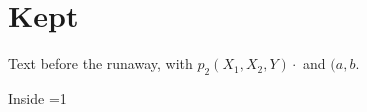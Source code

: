 \documentclass{article}
\begin{document}
\section{Kept}
Text before the runaway, with $p_{2}(X_{1},X_{2},Y)\cdot$ and $(a,b$.
\def\spin{=1 \expandafter\spin\fi}
\begin{center}Inside \spin\end{center}
\end{document}
